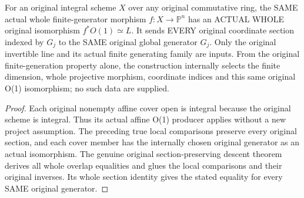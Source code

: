 \begin{theorem}
\label{thm:fc-generated-line-projective-twist-iso}
\leanok
{}
For an original integral scheme $X$ over any original commutative
ring, the SAME actual whole finite-generator morphism
$f:X\to\mathbb P^n$ has an ACTUAL WHOLE original isomorphism
$f^*O(1)\simeq L$. It sends EVERY original coordinate section
indexed by $G_j$ to the SAME original global generator $G_j$.
Only the original invertible line and its actual finite generating
family are inputs. From the original finite-generation property alone,
the construction internally selects the finite dimension, whole
projective morphism, coordinate indices and this same original O(1)
isomorphism; no such data are supplied.
\end{theorem}
\begin{proof}
Each original nonempty affine cover open is integral because the
original scheme is integral. Thus its actual affine O(1) producer
applies without a new project assumption. The preceding true local
comparisons preserve every original section, and each cover member
has the internally chosen original generator as an actual
isomorphism. The genuine original section-preserving descent
theorem derives all whole overlap equalities and glues the local
comparisons and their original inverses. Its whole section identity
gives the stated equality for every SAME original generator.
\end{proof}
